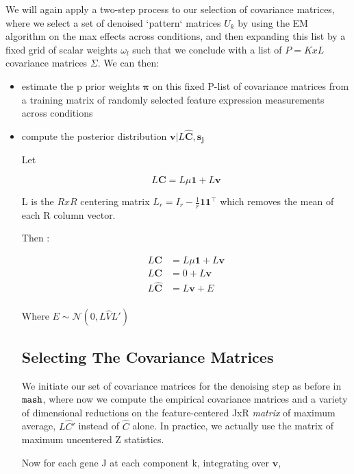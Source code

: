 \documentclass[11pt, oneside]{article}   	%
\newcommand{\Norm}{{\mathcal{N}}} %
\newcommand{\ceff}{\bm{C}}
\newcommand{\chat}{\bm{\hat{C}}}
\newcommand{\vb}{\bm{v}}
\def\mash{{\tt mash}}
\begin{document}
We will again apply a two-step process to our selection of covariance matrices, where we select a set of denoised `pattern` matrices $U_{k}$ by using the EM algorithm on the max effects across conditions,
and then expanding this list by a fixed grid of scalar weights $\omega_{l}$ such that we conclude with a list of $P=KxL$ covariance matrices $\Sigma$. We can then:
\begin{itemize}
\item estimate the p prior weights $\bm\pi$ on this fixed P-list of covariance matrices from a training matrix of randomly selected feature expression measurements across conditions
\item compute the posterior distribution $\vb | L \chat, \bm{s_{j}}$

Let 

\begin{equation}
L \ceff = L \mu \bm{1} + L \vb
\end{equation}

L is the $RxR$ centering matrix $L_{r}=I_{r}-{\tfrac  {1}{r}}{\mathbf  {1}}{\mathbf  {1}}^{\top }$ which removes the mean of each R column vector.

Then :

\begin{equation}
\begin{aligned}
L \ceff &= L \mu \bm{1}+ L \vb \\
L \ceff &= 0 + L \vb \\
L \chat &= L \vb + E \\
\end{aligned}
\end{equation}



Where $E \sim \Norm (0, L\hat{V} L')$


\subsection{Selecting The Covariance Matrices}

We initiate our set of covariance matrices for the denoising step as before in $\mash$, where now we compute the empirical covariance matrices and a variety of dimensional reductions on the feature-centered JxR \textit{matrix} of maximum average, $L \hat{C}' $ instead of $\hat{C}$ alone. In practice, we actually use the matrix of maximum uncentered Z statistics.

Now for each gene J at each component k, integrating over $\vb$,



\end{itemize}
\end{document}

